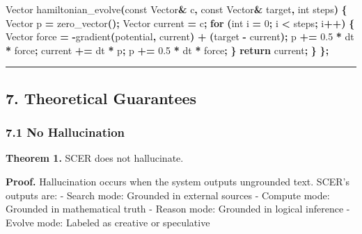 \documentclass[
  11pt,
  a4paper,
]{article}
\newenvironment{Shaded}{\begin{snugshade}}{\end{snugshade}}
\newcommand{\AttributeTok}[1]{\textcolor[rgb]{0.13,0.29,0.53}{#1}}
\newcommand{\ControlFlowTok}[1]{\textcolor[rgb]{0.13,0.29,0.53}{\textbf{#1}}}
\newcommand{\DataTypeTok}[1]{\textcolor[rgb]{0.13,0.29,0.53}{#1}}
\newcommand{\DecValTok}[1]{\textcolor[rgb]{0.00,0.00,0.81}{#1}}
\newcommand{\FloatTok}[1]{\textcolor[rgb]{0.00,0.00,0.81}{#1}}
\newcommand{\NormalTok}[1]{#1}
\newcommand{\OperatorTok}[1]{\textcolor[rgb]{0.81,0.36,0.00}{\textbf{#1}}}
\begin{document}
\begin{Shaded}
\begin{Highlighting}[]
\NormalTok{    Vector hamiltonian\_evolve}\OperatorTok{(}\AttributeTok{const}\NormalTok{ Vector}\OperatorTok{\&}\NormalTok{ c}\OperatorTok{,} \AttributeTok{const}\NormalTok{ Vector}\OperatorTok{\&}\NormalTok{ target}\OperatorTok{,} \DataTypeTok{int}\NormalTok{ steps}\OperatorTok{)} \OperatorTok{\{}
\NormalTok{        Vector p }\OperatorTok{=}\NormalTok{ zero\_vector}\OperatorTok{();}
\NormalTok{        Vector current }\OperatorTok{=}\NormalTok{ c}\OperatorTok{;}
        \ControlFlowTok{for} \OperatorTok{(}\DataTypeTok{int}\NormalTok{ i }\OperatorTok{=} \DecValTok{0}\OperatorTok{;}\NormalTok{ i }\OperatorTok{\textless{}}\NormalTok{ steps}\OperatorTok{;}\NormalTok{ i}\OperatorTok{++)} \OperatorTok{\{}
\NormalTok{            Vector force }\OperatorTok{=} \OperatorTok{{-}}\NormalTok{gradient}\OperatorTok{(}\NormalTok{potential}\OperatorTok{,}\NormalTok{ current}\OperatorTok{)} \OperatorTok{+} \OperatorTok{(}\NormalTok{target }\OperatorTok{{-}}\NormalTok{ current}\OperatorTok{);}
\NormalTok{            p }\OperatorTok{+=} \FloatTok{0.5} \OperatorTok{*}\NormalTok{ dt }\OperatorTok{*}\NormalTok{ force}\OperatorTok{;}
\NormalTok{            current }\OperatorTok{+=}\NormalTok{ dt }\OperatorTok{*}\NormalTok{ p}\OperatorTok{;}
\NormalTok{            p }\OperatorTok{+=} \FloatTok{0.5} \OperatorTok{*}\NormalTok{ dt }\OperatorTok{*}\NormalTok{ force}\OperatorTok{;}
        \OperatorTok{\}}
        \ControlFlowTok{return}\NormalTok{ current}\OperatorTok{;}
    \OperatorTok{\}}
\OperatorTok{\};}
\end{Highlighting}
\end{Shaded}

\begin{center}\rule{0.5\linewidth}{0.5pt}\end{center}

\subsection{7. Theoretical Guarantees}\label{theoretical-guarantees}

\subsubsection{7.1 No Hallucination}\label{no-hallucination}

\textbf{Theorem 1.} SCER does not hallucinate.

\textbf{Proof.} Hallucination occurs when the system outputs ungrounded
text. SCER's outputs are: - Search mode: Grounded in external sources -
Compute mode: Grounded in mathematical truth - Reason mode: Grounded in
logical inference - Evolve mode: Labeled as creative or speculative
\end{document}
